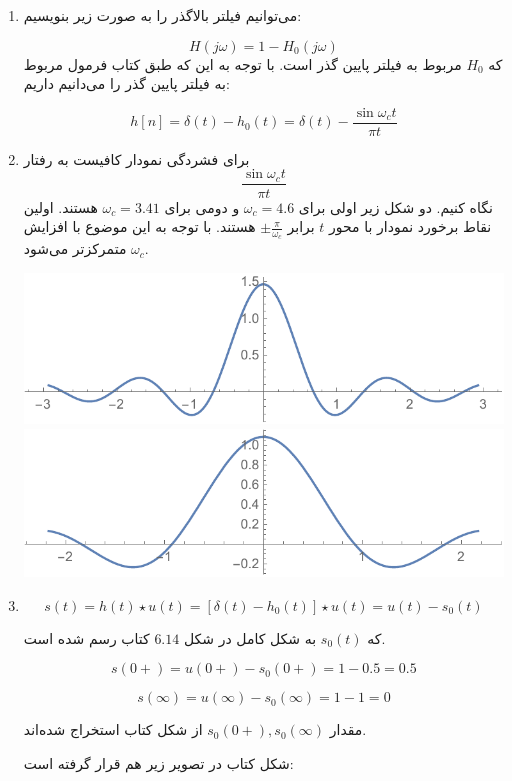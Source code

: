 \documentclass[12pt]{article}
\begin{document}
\begin{enumerate}
	\item 
	می‌توانیم فیلتر بالاگذر را به صورت زیر بنویسیم:
	
	$$H(j\omega) = 1 - H_0 (j \omega)$$
	که
	$H_0$
	مربوط به فیلتر پایین گذر است. با توجه به این که طبق کتاب فرمول مربوط به فیلتر پایین گذر را می‌دانیم داریم:
	
	$$h[n] = \delta(t) - h_0 (t) = \delta(t) - \frac{\sin \omega_c t}{\pi t}$$
	
	\item
	برای فشردگی نمودار کافیست به رفتار
	$$ \frac{\sin \omega_c t}{\pi t}$$
	نگاه کنیم. دو شکل زیر اولی برای $\omega_c = 4.6$ و دومی برای
	$\omega_c = 3.41$
	هستند. اولین نقاط برخورد نمودار با محور $t$ برابر
	$\pm \frac{\pi}{\omega_c} $
	هستند. با توجه به این موضوع با افزایش
	$\omega_c$
	متمرکزتر می‌شود.
	
	\includegraphics[width = 1.0\textwidth]{images/2.pdf}
	\includegraphics[width = 1.0\textwidth]{images/3.pdf}
	
	\item
	
	$$s(t) = h(t) \star u(t) = [\delta(t) - h_0 (t)] \star u(t) = u(t) - s_0(t)$$
	
	که 
	$s_0(t)$
	به شکل کامل در شکل $6.14$ کتاب رسم شده است.
	
	$$s(0+) = u(0+) -s_0(0+) = 1 - 0.5 = 0.5$$
	
	$$s(\infty) = u(\infty) - s_0(\infty) = 1-1 =0$$
	
	مقدار
	$s_0(0+),s_0(\infty)$
	از شکل کتاب استخراج شده‌اند.
	
	شکل کتاب در تصویر زیر هم قرار گرفته است:
	

\end{enumerate}
\end{document}
